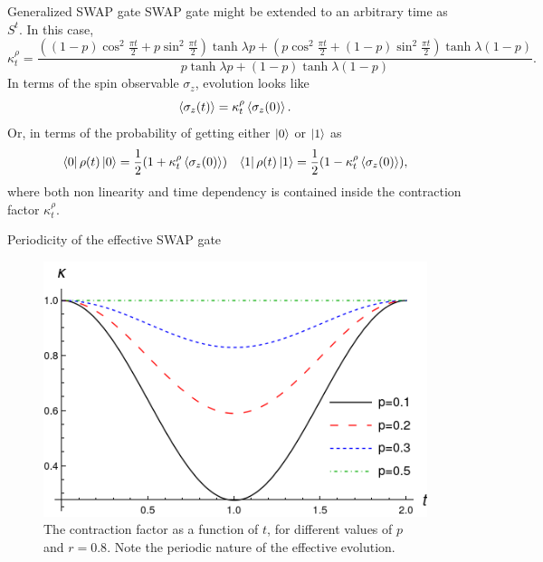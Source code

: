 \begin{frame}{Generalized SWAP gate}
    SWAP gate might be extended to an arbitrary time as $S^{t}$. In this case, 
    \begin{equation*}
        \kappa_{t}^{\rho}=\frac{((1-p)\cos^{2}{\frac{\pi t}{2}}+p\sin^{2}{\frac{\pi t}{2}})\tanh{\lambda p}+(p\cos^{2}{\frac{\pi t}{2}}+(1-p)\sin^{2}{\frac{\pi t}{2}})\tanh{\lambda (1-p)}}{
          p\tanh{\lambda p}+(1-p)\tanh{\lambda (1-p)}}.
      \end{equation*}
      In terms of the spin observable $\sigma_{z}$, evolution looks like
\begin{equation}
  \expval{\sigma_{z}(t)}=\kappa_{t}^{\rho}\expval{\sigma_{z}(0)}.
\end{equation}
Or, in terms of the probability of getting either $\ket{0}$ or $\ket{1}$ as
 \begin{align}
  \bra{0}\rho(t)\ket{0}=\frac{1}{2}(1+\kappa_{t}^{\rho}\expval{\sigma_{z}(0)}) && \bra{1}\rho(t)\ket{1}=\frac{1}{2}(1-\kappa_{t}^{\rho}\expval{\sigma_{z}(0)}),
 \end{align}
 where both non linearity and time dependency is contained inside the contraction factor $\kappa_{t}^{\rho}$. 
\end{frame}

\begin{frame}{Periodicity of the effective SWAP gate}
    \begin{figure}[h!]
        \includegraphics[width=0.5\columnwidth]{figures/ContractionFactorSWAP_z=0.8_t=0_to_t=2.png}%
        \caption{The contraction factor as a function of $t$, for different values of $p$ and $r=0.8$. Note the periodic nature of the effective evolution.}
    \end{figure}
\end{frame}

